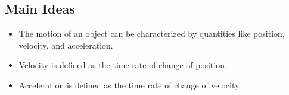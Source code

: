 \documentclass[]{article}
\begin{document}
\newpage
\begin{TeacherMargin}

\end{TeacherMargin}
\begin{PresentSpace}
\vspace{-0.5cm}
\section*{Main Ideas}
\vspace{-0.2cm}
\begin{itemize}
	\item The motion of an object can be characterized by quantities like position, velocity, and acceleration.
	\item Velocity is defined as the time rate of change of position.
	\item Acceleration is defined as the time rate of change of velocity.
\end{itemize}
\end{PresentSpace}
\end{document}
